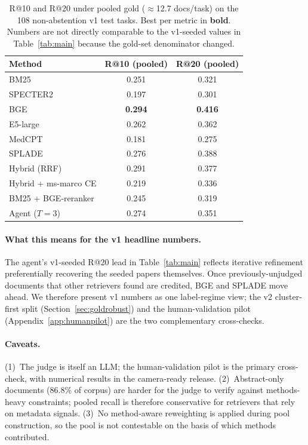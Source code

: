 \documentclass{article}
\begin{document}
\begin{table}[h]
\centering
\caption{R@10 and R@20 under pooled gold ($\approx$12.7 docs/task) on the 108 non-abstention v1 test tasks. Best per metric in \textbf{bold}. Numbers are not directly comparable to the v1-seeded values in Table~\ref{tab:main} because the gold-set denominator changed.}
\label{tab:pooled}
\small
\begin{tabular}{lcc}
\toprule
\textbf{Method} & \textbf{R@10 (pooled)} & \textbf{R@20 (pooled)} \\
\midrule
BM25                  & 0.251 & 0.321 \\
SPECTER2              & 0.197 & 0.301 \\
BGE                   & \textbf{0.294} & \textbf{0.416} \\
E5-large              & 0.262 & 0.362 \\
MedCPT                & 0.181 & 0.275 \\
SPLADE                & 0.276 & 0.388 \\
Hybrid (RRF)          & 0.291 & 0.377 \\
Hybrid + ms-marco CE  & 0.219 & 0.336 \\
BM25 + BGE-reranker   & 0.245 & 0.319 \\
Agent ($T{=}3$)       & 0.274 & 0.351 \\
\bottomrule
\end{tabular}
\end{table}

\paragraph{What this means for the v1 headline numbers.} The agent's v1-seeded R@20 lead in Table~\ref{tab:main} reflects iterative refinement preferentially recovering the seeded papers themselves. Once previously-unjudged documents that other retrievers found are credited, BGE and SPLADE move ahead. We therefore present v1 numbers as one label-regime view; the v2 cluster-first split (Section~\ref{sec:goldrobust}) and the human-validation pilot (Appendix~\ref{app:humanpilot}) are the two complementary cross-checks.

\paragraph{Caveats.} (1)~The judge is itself an LLM; the human-validation pilot is the primary cross-check, with numerical results in the camera-ready release. (2)~Abstract-only documents (86.8\% of corpus) are harder for the judge to verify against methods-heavy constraints; pooled recall is therefore conservative for retrievers that rely on metadata signals. (3)~No method-aware reweighting is applied during pool construction, so the pool is not contestable on the basis of which methods contributed.
\end{document}
